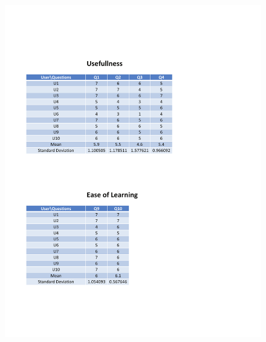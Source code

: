 \begin{appendices}
\begin{figure}[h!t]
    \centering
      \includegraphics[width=5.6in]{ch5/Result/Mobile/1.pdf}
  \label{fig:Result:Usefulness:EaseofLearning:Mobile}
\end{figure}


\end{appendices}
